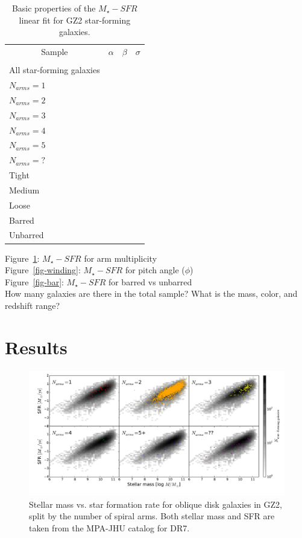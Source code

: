 \documentclass{emulateapj}
\begin{document}
\begin{table}
 \begin{tabular}{@{}lrcl}
 \hline
\multicolumn{1}{c}{Sample} &
\multicolumn{1}{c}{$\alpha$} &
\multicolumn{1}{c}{$\beta$} &
\multicolumn{1}{c}{$\sigma$} 
\\ 
\\ 
\hline
\hline						
All star-forming galaxies  & & & \\
\hline
$N_{arms} = 1$ & & & \\
$N_{arms} = 2$ & & & \\
$N_{arms} = 3$ & & & \\
$N_{arms} = 4$ & & & \\
$N_{arms} = 5$ & & & \\
$N_{arms} = ?$ & & & \\
\hline
Tight & & & \\
Medium & & & \\
Loose & & & \\
\hline
Barred & & & \\
Unbarred & & & \\
\hline
 \end{tabular}
 \caption{Basic properties of the $M_\star-SFR$ linear fit for GZ2 star-forming galaxies. \label{tbl-fits}}
\end{table}

Figure~\ref{fig-number}: $M_\star-SFR$ for arm multiplicity \\
Figure~\ref{fig-winding}: $M_\star-SFR$ for pitch angle ($\phi$) \\
Figure~\ref{fig-bar}: $M_\star-SFR$ for barred vs unbarred \\

How many galaxies are there in the total sample? What is the mass, color, and redshift range?


\section{Results} \label{sec-results}

\begin{figure}
\includegraphics[angle=0,width=7.0in]{ms_arms_number.pdf}
\caption{Stellar mass vs. star formation rate for oblique disk galaxies in GZ2, split by the number of spiral arms. Both stellar mass and SFR are taken from the MPA-JHU catalog for DR7. 
\label{fig-number}}
\end{figure}
\end{document}
